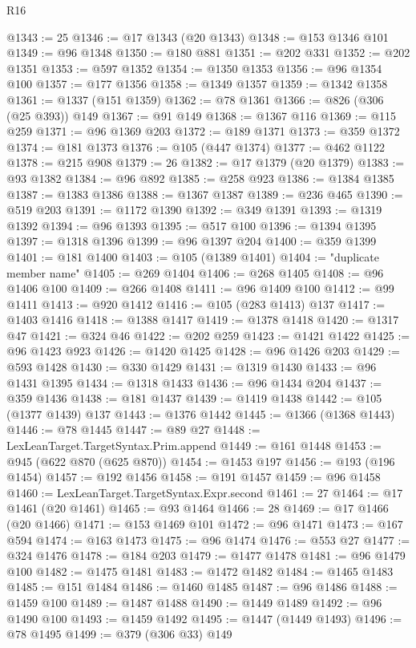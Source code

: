 \begin{lexlean}{R16}
\begin{coremodule}
@1343 := 25
@1346 := @17 @1343 (@20 @1343)
@1348 := @153 @1346 @101
@1349 := @96 @1348
@1350 := @180 @881
@1351 := @202 @331
@1352 := @202 @1351
@1353 := @597 @1352
@1354 := @1350 @1353
@1356 := @96 @1354 @100
@1357 := @177 @1356
@1358 := @1349 @1357
@1359 := @1342 @1358
@1361 := @1337 (@151 @1359)
@1362 := @78 @1361
@1366 := @826 (@306 (@25 @393)) @149
@1367 := @91 @149
@1368 := @1367 @116
@1369 := @115 @259
@1371 := @96 @1369 @203
@1372 := @189 @1371
@1373 := @359 @1372
@1374 := @181 @1373
@1376 := @105 (@447 @1374)
@1377 := @462 @1122
@1378 := @215 @908
@1379 := 26
@1382 := @17 @1379 (@20 @1379)
@1383 := @93 @1382
@1384 := @96 @892
@1385 := @258 @923
@1386 := @1384 @1385
@1387 := @1383 @1386
@1388 := @1367 @1387
@1389 := @236 @465
@1390 := @519 @203
@1391 := @1172 @1390
@1392 := @349 @1391
@1393 := @1319 @1392
@1394 := @96 @1393
@1395 := @517 @100
@1396 := @1394 @1395
@1397 := @1318 @1396
@1399 := @96 @1397 @204
@1400 := @359 @1399
@1401 := @181 @1400
@1403 := @105 (@1389 @1401)
@1404 := "duplicate member name"
@1405 := @269 @1404
@1406 := @268 @1405
@1408 := @96 @1406 @100
@1409 := @266 @1408
@1411 := @96 @1409 @100
@1412 := @99 @1411
@1413 := @920 @1412
@1416 := @105 (@283 @1413) @137
@1417 := @1403 @1416
@1418 := @1388 @1417
@1419 := @1378 @1418
@1420 := @1317 @47
@1421 := @324 @46
@1422 := @202 @259
@1423 := @1421 @1422
@1425 := @96 @1423 @923
@1426 := @1420 @1425
@1428 := @96 @1426 @203
@1429 := @593 @1428
@1430 := @330 @1429
@1431 := @1319 @1430
@1433 := @96 @1431 @1395
@1434 := @1318 @1433
@1436 := @96 @1434 @204
@1437 := @359 @1436
@1438 := @181 @1437
@1439 := @1419 @1438
@1442 := @105 (@1377 @1439) @137
@1443 := @1376 @1442
@1445 := @1366 (@1368 @1443)
@1446 := @78 @1445
@1447 := @89 @27
@1448 := LexLeanTarget.TargetSyntax.Prim.append
@1449 := @161 @1448
@1453 := @945 (@622 @870 (@625 @870))
@1454 := @1453 @197
@1456 := @193 (@196 @1454)
@1457 := @192 @1456
@1458 := @191 @1457
@1459 := @96 @1458
@1460 := LexLeanTarget.TargetSyntax.Expr.second
@1461 := 27
@1464 := @17 @1461 (@20 @1461)
@1465 := @93 @1464
@1466 := 28
@1469 := @17 @1466 (@20 @1466)
@1471 := @153 @1469 @101
@1472 := @96 @1471
@1473 := @167 @594
@1474 := @163 @1473
@1475 := @96 @1474
@1476 := @553 @27
@1477 := @324 @1476
@1478 := @184 @203
@1479 := @1477 @1478
@1481 := @96 @1479 @100
@1482 := @1475 @1481
@1483 := @1472 @1482
@1484 := @1465 @1483
@1485 := @151 @1484
@1486 := @1460 @1485
@1487 := @96 @1486
@1488 := @1459 @100
@1489 := @1487 @1488
@1490 := @1449 @1489
@1492 := @96 @1490 @100
@1493 := @1459 @1492
@1495 := @1447 (@1449 @1493)
@1496 := @78 @1495
@1499 := @379 (@306 @33) @149

\end{coremodule}
\end{lexlean}

